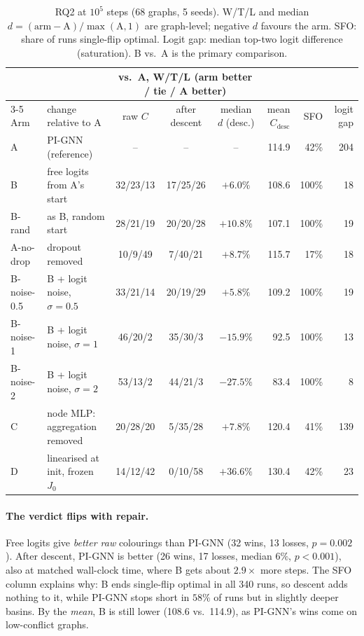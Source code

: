 \documentclass[11pt]{article}
\newcommand{\Cd}{C_{\mathrm{desc}}}
\newcommand{\wtl}[3]{#1/#2/#3}
\begin{document}
\begin{table}[t]
\centering\small\setlength{\tabcolsep}{4pt}
\begin{tabular}{@{}llcccrrr@{}}
\toprule
& & \multicolumn{3}{c}{vs.\ A, W/T/L (arm better / tie / A better)} & & & \\
\cmidrule(lr){3-5}
Arm & change relative to A & raw $C$ & after descent & median $d$ (desc.) &
mean $\Cd$ & SFO & logit gap \\
\midrule
A & PI-GNN (reference) & -- & -- & -- & 114.9 & 42\% & 204 \\
B & free logits from A's start & \wtl{32}{23}{13} & \wtl{17}{25}{26} & $+6.0\%$ & 108.6 & 100\% & 18 \\
B-rand & as B, random start & \wtl{28}{21}{19} & \wtl{20}{20}{28} & $+10.8\%$ & 107.1 & 100\% & 19 \\
A-no-drop & dropout removed & \wtl{10}{9}{49} & \wtl{7}{40}{21} & $+8.7\%$ & 115.7 & 17\% & 18 \\
B-noise-0.5 & B + logit noise, $\sigma{=}0.5$ & \wtl{33}{21}{14} & \wtl{20}{19}{29} & $+5.8\%$ & 109.2 & 100\% & 19 \\
B-noise-1 & B + logit noise, $\sigma{=}1$ & \wtl{46}{20}{2} & \wtl{35}{30}{3} & $-15.9\%$ & 92.5 & 100\% & 13 \\
B-noise-2 & B + logit noise, $\sigma{=}2$ & \wtl{53}{13}{2} & \wtl{44}{21}{3} & $-27.5\%$ & 83.4 & 100\% & 8 \\
C & node MLP: aggregation removed & \wtl{20}{28}{20} & \wtl{5}{35}{28} & $+7.8\%$ & 120.4 & 41\% & 139 \\
D & linearised at init, frozen $J_0$ & \wtl{14}{12}{42} & \wtl{0}{10}{58} & $+36.6\%$ & 130.4 & 42\% & 23 \\
\bottomrule
\end{tabular}
\caption{RQ2 at $10^5$ steps (68 graphs, 5 seeds). W/T/L and median
$d=(\text{arm}-\text{A})/\max(\text{A},1)$ are graph-level; negative $d$
favours the arm. SFO: share of runs single-flip optimal. Logit gap: median
top-two logit difference (saturation). B vs.\ A is the primary comparison.}
\label{tab:rq2}
\end{table}

\paragraph{The verdict flips with repair.} Free logits give \emph{better raw}
colourings than PI-GNN (32 wins, 13 losses, $p=0.002$). After descent, PI-GNN
is better (26 wins, 17 losses, median $6\%$, $p<0.001$), also at matched
wall-clock time, where B gets about $2.9\times$ more steps. The SFO column explains why: B ends single-flip optimal in all
340 runs, so descent adds nothing to it, while PI-GNN stops short in $58\%$ of
runs but in slightly deeper basins. By the \emph{mean}, B
is still lower (108.6 vs.\ 114.9), as PI-GNN's wins come on low-conflict
graphs.
\end{document}
